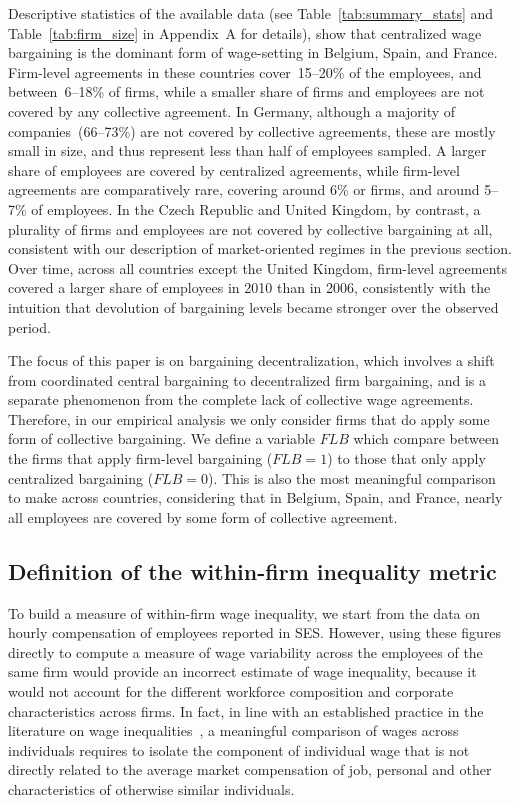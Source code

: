 \documentclass[Review,times,sageh,11pt]{sagej}
\begin{document}
Descriptive statistics of the available data (see Table~\ref{tab:summary_stats} and Table~\ref{tab:firm_size} in Appendix~A for details), show that centralized wage bargaining is the dominant form of wage-setting in Belgium, Spain, and France. Firm-level agreements in these countries cover~15--20\% of the employees, and between~6--18\% of firms, while a smaller share of firms and employees are not covered by any collective agreement. In Germany, although a majority of companies~(66--73\%) are not covered by collective agreements, these are mostly small in size, and thus represent less than half of employees sampled. A larger share of employees are covered by centralized agreements, while firm-level agreements are comparatively rare, covering around 6\% or firms, and around 5--7\% of employees. In the Czech Republic and United Kingdom, by contrast, a plurality of firms and employees are not covered by collective bargaining at all, consistent with our description of market-oriented regimes in the previous section. 
Over time, across all countries except the United Kingdom, firm-level agreements covered a larger share of employees in 2010 than in 2006, consistently with the intuition that devolution of bargaining levels became stronger over the observed period.

The focus of this paper is on bargaining decentralization, which involves a shift from coordinated central bargaining to decentralized firm bargaining, and is a separate phenomenon from the complete lack of collective wage agreements. Therefore, in our empirical analysis we only consider firms that do apply some form of collective bargaining. We define a variable $\mathit{FLB}$ which compare between the firms that apply firm-level bargaining ($\mathit{FLB}=1$) to those that only apply centralized bargaining ($\mathit{FLB}=0$).
This is also the most meaningful comparison to make across countries, considering that in Belgium, Spain, and France, nearly all employees are covered by some form of collective agreement.


\subsection*{Definition of the within-firm inequality metric}
\label{sec: inequality}
To build a measure of within-firm wage inequality, we start from the data on hourly compensation of employees reported in SES. However, using these figures directly to compute a measure of wage variability across the employees of the same firm would provide an incorrect estimate of wage inequality, because it would not account for the different workforce composition and corporate characteristics across firms. In fact, in line with an established practice in the literature on wage inequalities~\citep[dating at least since][]{winter.ebmer.1999}, a meaningful comparison of wages across individuals requires to isolate the component of individual wage that is not directly related to the average market compensation of job, personal and other characteristics of otherwise similar individuals.
\end{document}
